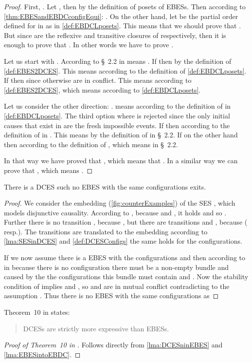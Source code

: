 \documentclass[runningheads,a4paper]{llncs}
\begin{document}
\begin{proof}
First, . Let , then  by the definition of posets of EBESs.
Then according to \theo\ref{thm:EBESandEBDCconfigEqui}: . On the other hand, let  be the partial
order defined for  in  as in \ref{def:EBDCLposets}. This
means that we should prove that . But since 
are the reflexive and transitive closures of  respectively, then it is
enough to prove that . In other words we have to prove
.

Let us start with . According to 
\S~2.2 in \cite{dynamicCausality15}  means
. If  then
 by the definition of  \ref{def:EBES2DCES}. This means  according to the definition of  \ref{def:EBDCLposets}.
If  then  since otherwise  are in conflict. This means
 according to \ref{def:EBES2DCES}, which means  according to \ref{def:EBDCLposets}.

Let us consider the other direction: .
 means  according to the definition of  in \ref{def:EBDCLposets}. The third option where  is rejected
since the only initial causes that exist in  are the fresh
impossible events. If  then  according to the definition of  in . This
means  by the definition of  in \S~2.2. If on the
other hand  then  according to the definition of
, which means  in \S~2.2.

In that way we have proved that , which means that . In a similar way we can prove that , which means .
\end{proof}


\begin{lemma}
\label{lma:DCESninEBES}
There is a DCES such no EBES with the same configurations exits.
\end{lemma}
\begin{proof}
We consider the embedding  (\cf \fig\ref{fig:counterExamples}) of the SES , which models disjunctive causality. According to , because  and , it holds  and so . Further there is no transition , because , but there are transitions  and , because  ( resp.). The transitions are translated to the embedding according to \lem\ref{lma:SESinDCES} and \ref{def:DCESConfigs} the same holds for the configurations. 

If we now assume there is a EBES  with the configurations  and  then according to  in \cite{dynamicCausality15} because there is no configuration  there must be a non-empty bundle  and caused by the the configurations  this bundle  must contain  and . Now the stability condition of  implies  and , so  and  are in mutual conflict contradicting to the assumption . Thus there is no EBES with the same configurations as 
\end{proof}

Theorem~10 in \cite{dynamicCausality15} states:
\begin{quote}
DCESs are strictly more expressive than EBESs.
\end{quote}

\begin{proof}[Proof of Theorem~10 in \cite{dynamicCausality15}]
Follows directly from \lems\ref{lma:DCESninEBES} and \ref{lma:EBESintoEBDC}.
\end{proof}



\end{document}
